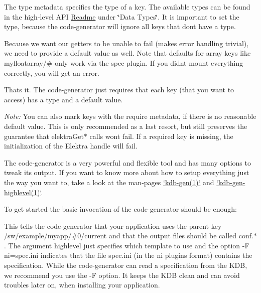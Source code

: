 The {\ttfamily type} metadata specifies the type of a key. The available types can be found in the high-\/level A\+PI \hyperlink{src_libs_highlevel_README_md}{Readme} under \char`\"{}\+Data Types\char`\"{}. It is important to set the {\ttfamily type}, because the code-\/generator will ignore all keys that don\textquotesingle{}t have a {\ttfamily type}.

Because we want our getters to be unable to fail (makes error handling trivial), we need to provide a {\ttfamily default} value as well. Note that {\ttfamily default}s for array keys like {\ttfamily myfloatarray/\#} only work via the {\ttfamily spec} plugin. If you didn\textquotesingle{}t mount everything correctly, you will get an error.

That\textquotesingle{}s it. The code-\/generator just requires that each key (that you want to access) has a {\ttfamily type} and a {\ttfamily default} value.

{\itshape Note\+:} You can also mark keys with the {\ttfamily require} metadata, if there is no reasonable default value. This is only recommended as a last resort, but still preserves the guarantee that {\ttfamily elektra\+Get$\ast$} calls won\textquotesingle{}t fail. If a {\ttfamily require}d key is missing, the initialization of the {\ttfamily Elektra} handle will fail.

The code-\/generator is a very powerful and flexible tool and has many options to tweak its output. If you want to know more about how to setup everything just the way you want to, take a look at the man-\/pages \hyperlink{doc_help_kdb-gen_md}{`kdb-\/gen(1)`} and \hyperlink{doc_help_kdb-gen-highlevel_md}{`kdb-\/gen-\/highlevel(1)`}.

To get started the basic invocation of the code-\/generator should be enough\+:




This tells the code-\/generator that your application uses the parent key {\ttfamily /sw/example/myapp/\#0/current} and that the output files should be called {\ttfamily conf.$\ast$}. The argument {\ttfamily highlevel} just specifies which template to use and the option {\ttfamily -\/F ni=spec.\+ini} indicates that the file {\ttfamily spec.\+ini} (in the {\ttfamily ni} plugin\textquotesingle{}s format) contains the specification. While the code-\/generator can read a specification from the K\+DB, we recommend you use the {\ttfamily -\/F} option. It keeps the K\+DB clean and can avoid troubles later on, when installing your application.

